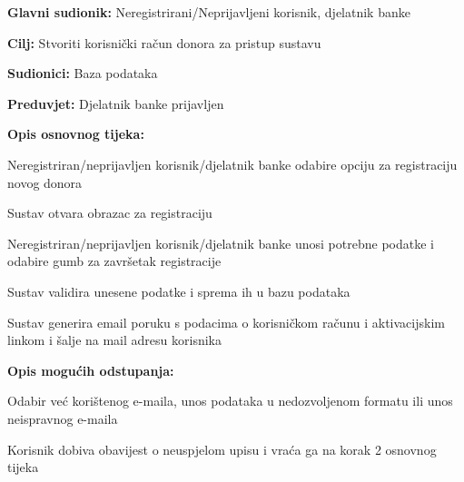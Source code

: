 \noindent {}
					\begin{packed_item}
	
						\item \textbf{Glavni sudionik: }Neregistrirani/Neprijavljeni korisnik, djelatnik banke
						\item \textbf{Cilj:} Stvoriti korisnički račun donora za pristup sustavu
						\item \textbf{Sudionici:} Baza podataka
						\item \textbf{Preduvjet:} Djelatnik banke prijavljen 
						\item \textbf{Opis osnovnog tijeka:}
						
						\item[] \begin{packed_enum}
	
							\item Neregistriran/neprijavljen korisnik/djelatnik banke odabire opciju za registraciju novog donora
							\item Sustav otvara obrazac za registraciju
							\item Neregistriran/neprijavljen korisnik/djelatnik banke unosi potrebne podatke i odabire gumb za završetak registracije
							\item Sustav validira unesene podatke i sprema ih u bazu podataka
							\item Sustav generira email poruku s podacima o korisničkom računu i aktivacijskim linkom i šalje na mail adresu korisnika
							
						\end{packed_enum}
						
						\item  \textbf{Opis mogućih odstupanja:}
						
						\item[] \begin{packed_item}
	
							\item[2.a] Odabir već korištenog e-maila, unos podataka u nedozvoljenom formatu ili unos neispravnog e-maila
							\item[] \begin{packed_enum}
								
								\item Korisnik dobiva obavijest o neuspjelom upisu i vraća ga na korak 2 osnovnog tijeka
								
							\end{packed_enum}
							
							
						\end{packed_item}
					\end{packed_item}
